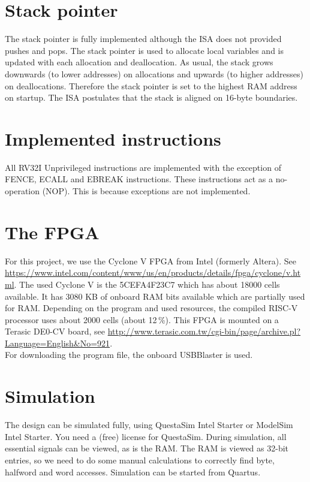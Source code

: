 \documentclass[12pt]{article}
\begin{document}
\section{Stack pointer}
The stack pointer is fully implemented although the ISA does not provided pushes and pops. The stack pointer is used to allocate local variables and is updated with each allocation and deallocation. As usual, the stack grows downwards (to lower addresses) on allocations and upwards (to higher addresses) on deallocations. Therefore the stack pointer is set to the highest RAM address on startup. The ISA postulates that the stack is aligned on 16-byte boundaries.


\section{Implemented instructions}
All RV32I Unprivileged instructions are implemented with the exception of FENCE, ECALL and EBREAK instructions. These instructions act as a no-operation (NOP). This is because exceptions are not implemented.

\section{The FPGA}
For this project, we use the Cyclone V FPGA from Intel (formerly Altera). See \url{https://www.intel.com/content/www/us/en/products/details/fpga/cyclone/v.html}.
The used Cyclone V is the 5CEFA4F23C7 which has about 18000 cells available. It has 3080 KB of onboard RAM bits available which are partially used for RAM. Depending on the program and used resources, the compiled RISC-V processor uses about 2000 cells (about 12\,\%). This FPGA is mounted on a Terasic DE0-CV board, see \url{http://www.terasic.com.tw/cgi-bin/page/archive.pl?Language=English&No=921}.\\ For downloading the program file, the onboard USBBlaster is used.

\section{Simulation}
The design can be simulated fully, using QuestaSim Intel Starter or ModelSim Intel Starter. You need a (free) license for QuestaSim. During simulation, all essential signals can be viewed, as is the RAM. The RAM is viewed as 32-bit entries, so we need to do some manual calculations to correctly find byte, halfword and word accesses. Simulation can be started from Quartus.
\end{document}
